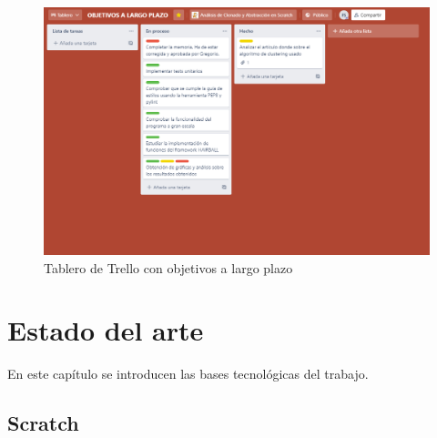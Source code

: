 \documentclass[a4paper, 12pt]{book}
\begin{document}
  \begin{figure}[h]
  	 \centering
    \includegraphics[width=15cm, keepaspectratio]{img/obj_largoplazo.png}
    \caption{Tablero de Trello con objetivos a largo plazo}
    \label{fig:tableros_trello}
 \end{figure}
 


\cleardoublepage
\chapter{Estado del arte}
\label{chap:estado}

En este capítulo se introducen las bases tecnológicas del trabajo.

\section{Scratch}
\label{sec:Scratch}
\end{document}
